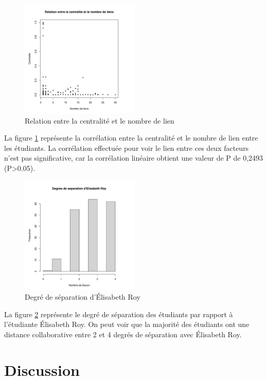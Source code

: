 \documentclass[9pt,twocolumn,twoside,]{pnas-new}
\begin{document}
\begin{figure}
\centering
\includegraphics[width=0.5\textwidth,height=0.4\textheight]{../results/centralite.pdf}
\caption{Relation entre la centralité et le nombre de lien
\label{fig:plot2}}
\end{figure}

La figure \ref{fig:plot2} représente la corrélation entre la centralité
et le nombre de lien entre les étudiants. La corrélation effectuée pour
voir le lien entre ces deux facteurs n'est pas significative, car la
corrélation linéaire obtient une valeur de P de 0,2493
(P\textgreater0.05).

\begin{figure}
\centering
\includegraphics[width=0.5\textwidth,height=0.4\textheight]{../results/bacon.pdf}
\caption{Degré de séparation d'Élisabeth Roy \label{fig:plot3}}
\end{figure}

La figure \ref{fig:plot3} représente le degré de séparation des
étudiants par rapport à l'étudiante Élisabeth Roy. On peut voir que la
majorité des étudiants ont une distance collaborative entre 2 et 4
degrés de séparation avec Élisabeth Roy.

\hypertarget{discussion}{%
\section{Discussion}\label{discussion}}
\end{document}
